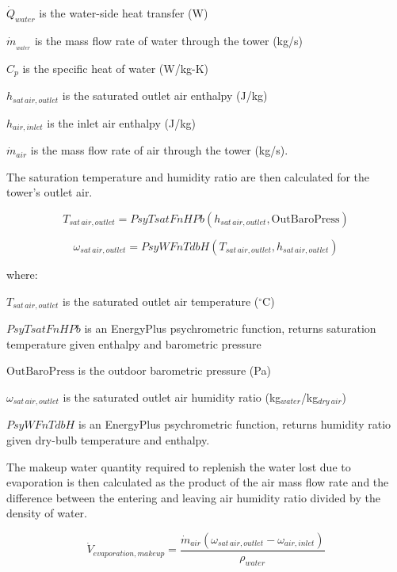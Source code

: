 \({\dot Q_{water}}\) is the water-side heat transfer (W)

\({\dot m_{_{water}}}\) is the mass flow rate of water through the tower (kg/s)

\({C_p}\) is the specific heat of water (W/kg-K)

\({h_{sat\,air,outlet}}\) is the saturated outlet air enthalpy (J/kg)

\({h_{air,inlet}}\) is the inlet air enthalpy (J/kg)

\({\dot m_{air}}\) is the mass flow rate of air through the tower (kg/s).

The saturation temperature and humidity ratio are then calculated for the tower's outlet air.

\begin{equation}
{T_{sat\,air,outlet}} = PsyTsatFnHPb\left( {{h_{sat\,air,outlet}},{\mathrm{OutBaroPress}}} \right)
\end{equation}

\begin{equation}
{\omega_{sat\,air,outlet}} = PsyWFnTdbH\left( {{T_{sat\,air,outlet}},{h_{sat\,air,outlet}}} \right)
\end{equation}

where:

\({T_{sat\,air,outlet}}\) is the saturated outlet air temperature (\(^{\circ}\)C)

\(PsyTsatFnHPb\) is an EnergyPlus psychrometric function, returns saturation temperature given enthalpy and barometric pressure

\({\mathrm{OutBaroPress}}\) is the outdoor barometric pressure (Pa)

\({\omega_{sat\,air,outlet}}\) is the saturated outlet air humidity ratio (kg\(_{water}\)/kg\(_{dry~air}\))

\(PsyWFnTdbH\) is an EnergyPlus psychrometric function, returns humidity ratio given dry-bulb temperature and enthalpy.

The makeup water quantity required to replenish the water lost due to evaporation is then calculated as the product of the air mass flow rate and the difference between the entering and leaving air humidity ratio divided by the density of water.

\begin{equation}
{\dot V_{evaporation,makeup}} = \frac{{{{\dot m}_{air}}\left( {{\omega_{sat\,air,outlet}} - {\omega_{air,inlet}}} \right)}}{{{\rho_{water}}}}
\end{equation}

